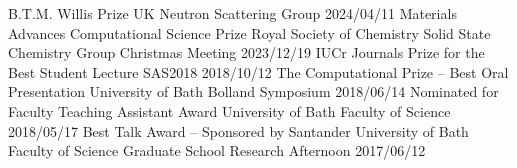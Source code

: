 \begin{cvpubs}
  \cvpub
    {B.T.M. Willis Prize}
    {UK Neutron Scattering Group}
    {2024/04/11}
  \cvpub
    {Materials Advances Computational Science Prize}
    {Royal Society of Chemistry Solid State Chemistry Group Christmas Meeting}
    {2023/12/19}
  \cvpub
    {IUCr Journals Prize for the Best Student Lecture}
    {SAS2018}
    {2018/10/12}
  \cvpub
    {The Computational Prize -- Best Oral Presentation}
    {University of Bath Bolland Symposium}
    {2018/06/14}
  \cvpub
    {Nominated for Faculty Teaching Assistant Award}
    {University of Bath Faculty of Science}
    {2018/05/17}
  \cvpub
    {Best Talk Award -- Sponsored by Santander}
    {University of Bath Faculty of Science Graduate School Research Afternoon}
    {2017/06/12}
\end{cvpubs}
